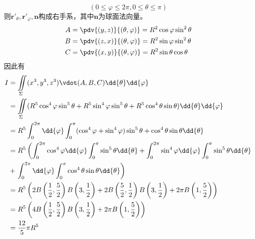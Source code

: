 \begin{solution}
\begin{enumerate}[(1)]
              \[ (0\leq \varphi \leq 2\pi, 0\leq \theta \leq \pi) \]
              则$\bm{r}'_\theta, \bm{r}'_\varphi, \bm{n}$构成右手系，其中$\bm{n}$为球面法向量。
              \begin{align*}
                  A & = \pdv{(y,z)}{(\theta,\varphi)} = R^2\cos\varphi\sin^2\theta \\
                  B & = \pdv{(z,x)}{(\theta,\varphi)} = R^2\sin\varphi\sin^2\theta \\
                  C & = \pdv{(x,y)}{(\theta,\varphi)} = R^2\sin\theta\cos\theta
              \end{align*}
              因此有
              \begin{align*}
                  I & =  \iint\limits_\Sigma (x^3,y^3,z^3)\vdot(A,B,C)\dd{\theta}\dd{\varphi}                                                                    \\
                    & =     \iint\limits_\Sigma (R^5\cos^4\varphi\sin^5\theta + R^5\sin^4\varphi\sin^5\theta + R^5\cos^4\theta\sin\theta)\dd{\theta}\dd{\varphi} \\
                    & =     R^5\int_0^{2\pi}\dd{\varphi}\int_0^{\pi} (\cos^4\varphi + \sin^4\varphi)\sin^5\theta + \cos^4\theta\sin\theta\dd{\theta}             \\
                    & =     R^5\left(\int_0^{2\pi} \cos^4\varphi \dd{\varphi}\int_0^{\pi}\sin^5\theta\dd{\theta}
                  + \int_0^{2\pi} \sin^4\varphi \dd{\varphi}\int_0^{\pi}\sin^5\theta\dd{\theta}\right.                                                           \\
                    & + \left.\int_0^{2\pi} \dd{\varphi}\int_0^{\pi} \cos^4\theta\sin\theta\dd{\theta}\right)                                                    \\
                    & = R^5\left(2B\left(\frac{1}{2},\frac{5}{2}\right)B\left(3,\frac{1}{2}\right)
                  + 2B\left(\frac{5}{2},\frac{1}{2}\right)B\left(3,\frac{1}{2}\right)
                  +2\pi B\left(1,\frac{5}{2}\right)\right)                                                                                                       \\
                    & =R^5\left(4B\left(\frac{1}{2},\frac{5}{2}\right)B\left(3,\frac{1}{2}\right)+2\pi B\left(1,\frac{5}{2}\right)\right)                        \\
                    & =\frac{12}{5}\pi R^5
              \end{align*}
    \end{enumerate}
\end{solution}

